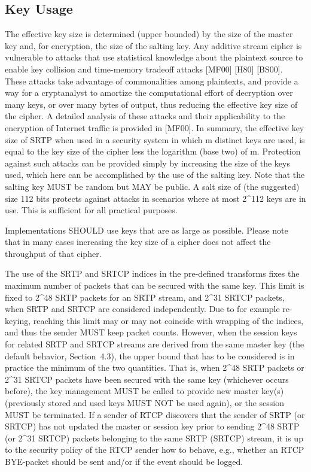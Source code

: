 \documentclass{article}
\begin{document}
\subsection{Key Usage}

The effective key size is determined (upper bounded) by the size of the master key and, for encryption, the size of the salting key.  Any additive stream cipher is vulnerable to attacks that use statistical knowledge about the plaintext source to enable key collision and time-memory tradeoff attacks [MF00] [H80] [BS00].  These attacks take advantage of commonalities among plaintexts, and provide a way for a cryptanalyst to amortize the computational effort of decryption over many keys, or over many bytes of output, thus reducing the effective key size of the cipher.  A detailed analysis of these attacks and their applicability to the encryption of Internet traffic is provided in [MF00].  In summary, the effective key size of SRTP when used in a security system in which m distinct keys are used, is equal to the key size of the cipher less the logarithm (base two) of m. Protection against such attacks can be provided simply by increasing the size of the keys used, which here can be accomplished by the use of the salting key.  Note that the salting key MUST be random but MAY be public.  A salt size of (the suggested) size 112 bits protects against attacks in scenarios where at most 2\textasciicircum{}112 keys are in use. This is sufficient for all practical purposes.

Implementations SHOULD use keys that are as large as possible. Please note that in many cases increasing the key size of a cipher does not affect the throughput of that cipher.

The use of the SRTP and SRTCP indices in the pre-defined transforms fixes the maximum number of packets that can be secured with the same key.  This limit is fixed to 2\textasciicircum{}48 SRTP packets for an SRTP stream, and 2\textasciicircum{}31 SRTCP packets, when SRTP and SRTCP are considered independently.  Due to for example re-keying, reaching this limit may or may not coincide with wrapping of the indices, and thus the sender MUST keep packet counts.  However, when the session keys for related SRTP and SRTCP streams are derived from the same master key (the default behavior, Section~4.3), the upper bound that has to be considered is in practice the minimum of the two quantities.  That is, when 2\textasciicircum{}48 SRTP packets or 2\textasciicircum{}31 SRTCP packets have been secured with the same key (whichever occurs before), the key management MUST be called to provide new master key(s) (previously stored and used keys MUST NOT be used again), or the session MUST be terminated.  If a sender of RTCP discovers that the sender of SRTP (or SRTCP) has not updated the master or session key prior to sending 2\textasciicircum{}48 SRTP (or 2\textasciicircum{}31 SRTCP) packets belonging to the same SRTP (SRTCP) stream, it is up to the security policy of the RTCP sender how to behave, e.g., whether an RTCP BYE-packet should be sent and/or if the event should be logged.
\end{document}
